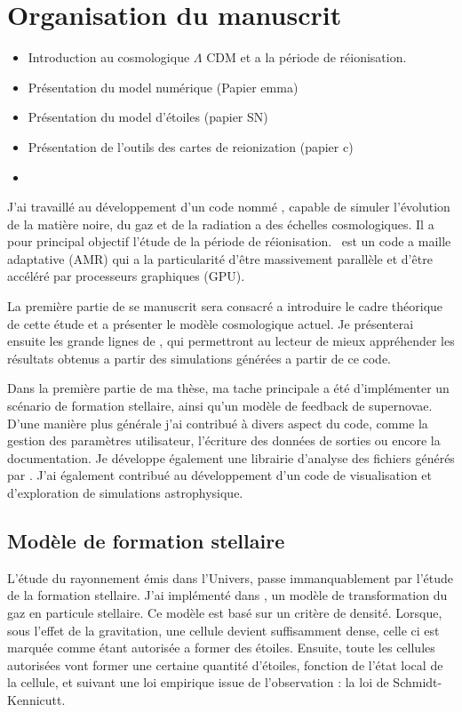\section{Organisation du manuscrit}
\begin{itemize}
\item Introduction au   cosmologique $\Lambda$ CDM et a la période de réionisation.
\item Présentation du model numérique (Papier emma)
\item Présentation du model d'étoiles (papier SN)
\item Présentation de l'outils des cartes de reionization (papier c)
\item 
\end{itemize}




J'ai travaillé au développement d'un code nommé \emma, capable de simuler l'évolution de la matière noire, du gaz et de la radiation a des échelles cosmologiques.
Il a pour principal objectif l'étude de la période de réionisation.
\emma\ est un code a maille adaptative (AMR) qui a la particularité d'être massivement parallèle et d'être accéléré par processeurs graphiques (\ac{GPU}).

La première partie de se manuscrit sera consacré a introduire le cadre théorique de cette étude et a présenter le modèle cosmologique actuel.
Je présenterai ensuite les grande lignes de \emma, qui permettront au lecteur de mieux appréhender les résultats obtenus a partir des simulations générées a partir de ce code.

Dans la première partie de ma thèse, ma tache principale a été d'implémenter un scénario de formation stellaire, ainsi qu'un modèle de feedback de supernovae.
D'une manière plus générale j'ai contribué à divers aspect du code, comme la gestion des paramètres utilisateur, l'écriture des données de sorties ou encore la documentation.
Je développe également une librairie d'analyse des fichiers générés par \emma.
J'ai également contribué au développement d'un code de visualisation et d'exploration de simulations astrophysique.

\subsection*{Mod\`ele de formation stellaire}
L'étude du rayonnement émis dans l'Univers, passe immanquablement par l'étude de la formation stellaire.
J'ai implémenté dans \emma, un modèle de transformation du gaz en particule stellaire.
Ce modèle est basé sur un critère de densité.
Lorsque, sous l'effet de la gravitation, une cellule devient suffisamment dense, celle ci est marquée comme étant autorisée a former des étoiles.
Ensuite, toute les cellules autorisées vont former une certaine quantité d'étoiles, fonction de l'état local de la cellule, et suivant une loi empirique issue de l'observation : la loi de Schmidt-Kennicutt.

